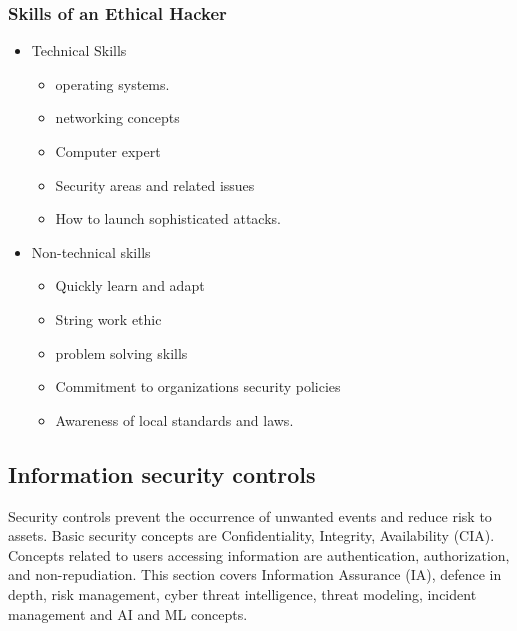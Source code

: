 \subsubsection{Skills of an Ethical Hacker}
\begin{itemize}
    \item Technical Skills
    \begin{itemize}
        \item operating systems.
        \item networking concepts
        \item Computer expert
        \item Security areas and related issues
        \item How to launch sophisticated attacks.
    \end{itemize}
    \item Non-technical skills
    \begin{itemize}
        \item Quickly learn and adapt
        \item String work ethic
        \item problem solving skills
        \item Commitment to organizations security policies
        \item Awareness of local standards and laws.
    \end{itemize}
\end{itemize}

\subsection{Information security controls}
Security controls prevent the occurrence of unwanted events and reduce risk to assets.
Basic security concepts are Confidentiality, Integrity, Availability (CIA).
Concepts related to users accessing information are authentication, authorization, and non-repudiation.
This section covers Information Assurance (IA), defence in depth, risk management, cyber threat intelligence, threat modeling, incident management and AI and ML concepts. 

